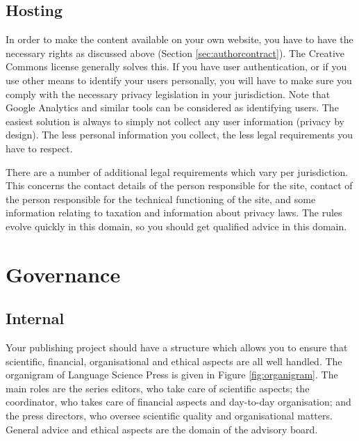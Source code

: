 \documentclass[nonflat,modfonts,output=book] {langsci/langscibook}
\begin{document}
\subsection{Hosting}
In order to make the content available on your own website, you have to have the necessary rights as discussed above (Section \ref{sec:authorcontract}). The Creative Commons license generally solves this. If you have user authentication, or if you use other means to identify your users personally, you will have to make sure you comply with the necessary privacy legislation in your jurisdiction. Note that Google Analytics and similar tools can be considered as identifying users. The easiest solution is always to simply not collect any user information (privacy by design). The less personal information you collect, the less legal requirements you have to respect. 

There are a number of additional legal requirements which vary per jurisdiction. This concerns the contact details of the person responsible for the site, contact of the person responsible for the technical functioning of the site, and some information relating to taxation and information about privacy laws. The rules evolve quickly in this domain, so you should get qualified advice in this domain. 


\section{Governance}\label{sec:governance}
\subsection{Internal}
Your publishing project should have a structure which allows you to ensure that scientific, financial, organisational and ethical aspects are all well handled. The organigram of Language Science Press is given in Figure \ref{fig:organigram}. The main roles are the series editors, who take care of scientific aspects; the coordinator, who takes care of financial aspects and day-to-day organisation; and the press directors, who oversee scientific quality and organisational matters. General advice and ethical aspects are the domain of the advisory board. 
\end{document}
